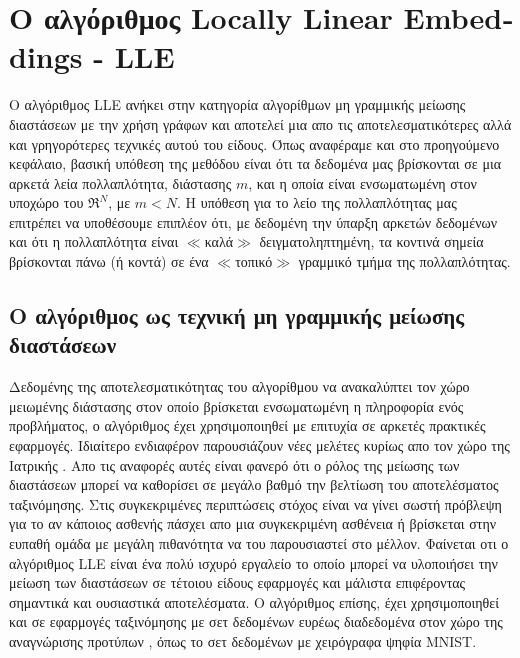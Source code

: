 
\chapter{Ο αλγόριθμος \textlatin{Locally Linear Embeddings - LLE}}
\par
Ο αλγόριθμος \textlatin{LLE} ανήκει στην κατηγορία αλγορίθμων μη γραμμικής μείωσης διαστάσεων με την χρήση γράφων και αποτελεί μια απο τις αποτελεσματικότερες αλλά και γρηγορότερες τεχνικές αυτού του είδους. Όπως αναφέραμε και στο προηγούμενο κεφάλαιο, βασική υπόθεση της μεθόδου είναι ότι τα δεδομένα μας βρίσκονται σε μια αρκετά λεία πολλαπλότητα, διάστασης $m$, και η οποία είναι ενσωματωμένη στον υποχώρο του $ \Re^{N} $, με $m<N$. Η υπόθεση για το λείο της πολλαπλότητας μας επιτρέπει να υποθέσουμε επιπλέον ότι, με δεδομένη την ύπαρξη αρκετών δεδομένων και ότι η πολλαπλότητα είναι $\ll$καλά$\gg$ δειγματοληπτημένη, τα κοντινά σημεία βρίσκονται πάνω (ή κοντά) σε ένα $\ll$τοπικό$\gg$ γραμμικό τμήμα της πολλαπλότητας.

\section{Ο αλγόριθμος ως τεχνική μη γραμμικής μείωσης διαστάσεων}
\par
Δεδομένης της αποτελεσματικότητας του αλγορίθμου να ανακαλύπτει τον χώρο μειωμένης διάστασης στον οποίο βρίσκεται ενσωματωμένη η πληροφορία ενός προβλήματος, ο αλγόριθμος έχει χρησιμοποιηθεί με επιτυχία σε αρκετές πρακτικές εφαρμογές. Ιδιαίτερο ενδιαφέρον παρουσιάζουν νέες μελέτες κυρίως απο τον χώρο της Ιατρικής \cite{1} \cite{2}. Απο τις αναφορές αυτές είναι φανερό ότι ο ρόλος της μείωσης των διαστάσεων μπορεί να καθορίσει σε μεγάλο βαθμό την βελτίωση του αποτελέσματος ταξινόμησης. Στις συγκεκριμένες περιπτώσεις στόχος είναι να γίνει σωστή πρόβλεψη για το αν κάποιος ασθενής πάσχει απο μια συγκεκριμένη ασθένεια ή βρίσκεται στην ευπαθή ομάδα με μεγάλη πιθανότητα να του παρουσιαστεί στο μέλλον. Φαίνεται οτι ο αλγόριθμος \textlatin{LLE} είναι ένα πολύ ισχυρό εργαλείο το οποίο μπορεί να υλοποιήσει την μείωση των διαστάσεων σε τέτοιου είδους εφαρμογές και μάλιστα επιφέροντας σημαντικά και ουσιαστικά αποτελέσματα. Ο αλγόριθμος επίσης, έχει χρησιμοποιηθεί και σε εφαρμογές ταξινόμησης με σετ δεδομένων ευρέως διαδεδομένα στον χώρο της αναγνώρισης προτύπων \cite{3} \cite{4} \cite{5}, όπως το σετ δεδομένων με χειρόγραφα ψηφία \textlatin{MNIST}.


